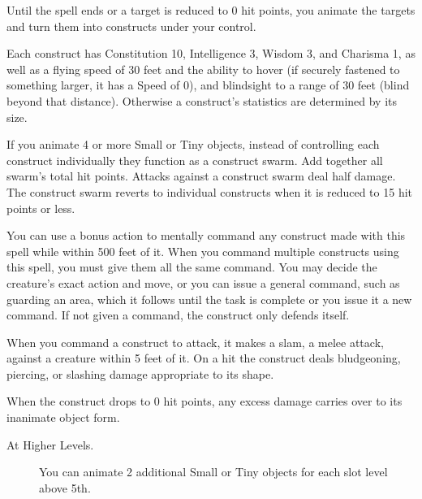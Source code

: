 Until the spell ends or a target is reduced to 0 hit points, you animate
the targets and turn them into constructs under your control.

Each construct has Constitution 10, Intelligence 3, Wisdom 3, and
Charisma 1, as well as a flying speed of 30 feet and the ability to
hover (if securely fastened to something larger, it has a Speed of 0),
and blindsight to a range of 30 feet (blind beyond that distance).
Otherwise a construct's statistics are determined by its size.

If you animate 4 or more Small or Tiny objects, instead of controlling
each construct individually they function as a construct swarm. Add
together all swarm's total hit points. Attacks against a construct swarm
deal half damage. The construct swarm reverts to individual constructs
when it is reduced to 15 hit points or less.

You can use a bonus action to mentally command any construct made with
this spell while within 500 feet of it. When you command multiple
constructs using this spell, you must give them all the same command.
You may decide the creature's exact action and move, or you can issue a
general command, such as guarding an area, which it follows until the
task is complete or you issue it a new command. If not given a command,
the construct only defends itself.

When you command a construct to attack, it makes a slam, a melee attack,
against a creature within 5 feet of it. On a hit the construct deals
bludgeoning, piercing, or slashing damage appropriate to its shape.

When the construct drops to 0 hit points, any excess damage carries over
to its inanimate object form.

\begin{description}
\item[At Higher Levels.]
You can animate 2 additional Small or Tiny objects for each slot level
above 5th.
\end{description}

